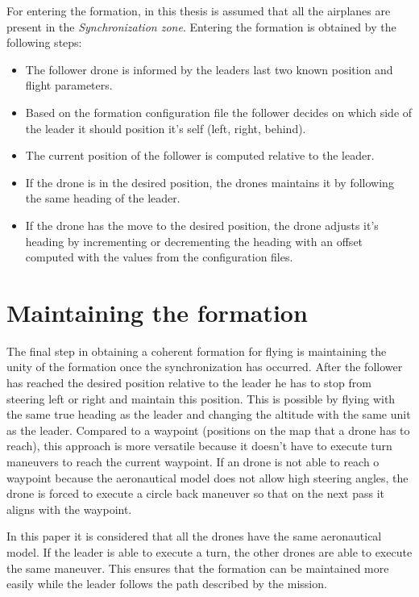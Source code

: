 \newpage

For entering the formation, in this thesis is assumed that all the airplanes are
present in the \textit {Synchronization zone}. Entering the formation is obtained
by the following steps:

\begin {itemize}
\item The follower drone is informed by the leaders last two known position and flight
parameters.
\item Based on the formation configuration file the follower decides on which side
of the leader it should position it's self (left, right, behind).
\item The current position of the follower is computed relative to the leader.
\item If the drone is in the desired position, the drones maintains it 
by following the same heading of the leader.
\item If the drone has the move to the desired position, the drone adjusts it's
heading by incrementing or decrementing the heading with an offset computed
with the values from the configuration files.
\end {itemize}

\section{Maintaining the formation}
\label{sec:formation-maintainig}
The final step in obtaining a coherent formation for flying is maintaining
the unity of the formation once the synchronization has occurred. After
the follower has reached the desired position relative to the leader
he has to stop from steering left or right and maintain this position. This
is possible by flying with the same true heading as the leader and changing the
altitude with the same unit as the leader. Compared to a waypoint (positions on
the map that a drone has to reach), this approach is more versatile
because it doesn't have to execute turn maneuvers to reach the current waypoint.
If an drone is not able to reach o waypoint because the aeronautical model
does not allow high steering angles, the drone is forced to execute a 
circle back maneuver so that on the next pass it aligns with the waypoint. 

In this paper it is considered that all the drones have the same aeronautical model.
If the leader is able to execute a turn, the other drones are able to execute
the same maneuver. This ensures that the formation can be maintained
more easily while the leader follows the path described by the mission. 

